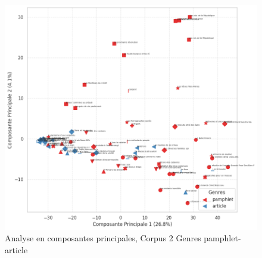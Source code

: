 \begin{figure}[H]
\centering %
\includegraphics[width=1\textwidth]{img/ACP-corpus-2-PamArticle.png}
\caption{Analyse en composantes principales, Corpus 2 Genres pamphlet-article}
\label{'fig:ACP-corpus-2-PamArticle'}
\end{figure}

